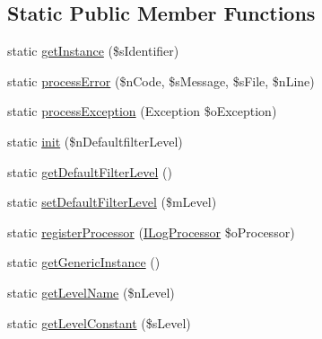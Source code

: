 \subsection*{Static Public Member Functions}
\begin{DoxyCompactItemize}
\item 
static \hyperlink{class_logger_aed3978ed47955016b1f2e36fa9242495}{get\-Instance} (\$s\-Identifier)
\item 
static \hyperlink{class_logger_ab19e37ceb28c720c85dbd1190247f094}{process\-Error} (\$n\-Code, \$s\-Message, \$s\-File, \$n\-Line)
\item 
static \hyperlink{class_logger_ab6ff3cbd5cae35325708da45422f9ddb}{process\-Exception} (Exception \$o\-Exception)
\item 
static \hyperlink{class_logger_adabe3643869b619254f23b0ff7a8d9d0}{init} (\$n\-Defaultfilter\-Level)
\item 
static \hyperlink{class_logger_a3af4a199ee9ff77080b287d445fd7258}{get\-Default\-Filter\-Level} ()
\item 
static \hyperlink{class_logger_a7af0235d7605c027e8fc05014c5e8a02}{set\-Default\-Filter\-Level} (\$m\-Level)
\item 
static \hyperlink{class_logger_a67f68a274b78033665beb7e42c3367ad}{register\-Processor} (\hyperlink{interface_i_log_processor}{I\-Log\-Processor} \$o\-Processor)
\item 
static \hyperlink{class_logger_a7cd51ad43efe88cfde3c1ebdc988940b}{get\-Generic\-Instance} ()
\item 
static \hyperlink{class_logger_a01709c6e4bc16337f430ab0d657f187f}{get\-Level\-Name} (\$n\-Level)
\item 
static \hyperlink{class_logger_aba0511b6a8e0338bfe1edf5fb6eb4b59}{get\-Level\-Constant} (\$s\-Level)
\end{DoxyCompactItemize}
